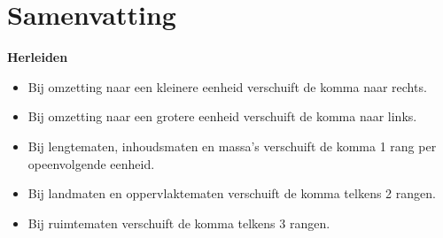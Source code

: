 \documentclass[a4paper,12pt]{article}
\begin{document}
\section*{Samenvatting}
\textbf{Herleiden}
\begin{itemize}
  \item Bij omzetting naar een kleinere eenheid verschuift de komma naar rechts.
  \item Bij omzetting naar een grotere eenheid verschuift de komma naar links.
  \item Bij lengtematen, inhoudsmaten en massa's verschuift de komma 1 rang per opeenvolgende eenheid.
  \item Bij landmaten en oppervlaktematen verschuift de komma telkens 2 rangen.
  \item Bij ruimtematen verschuift de komma telkens 3 rangen.
\end{itemize}
\end{document}

